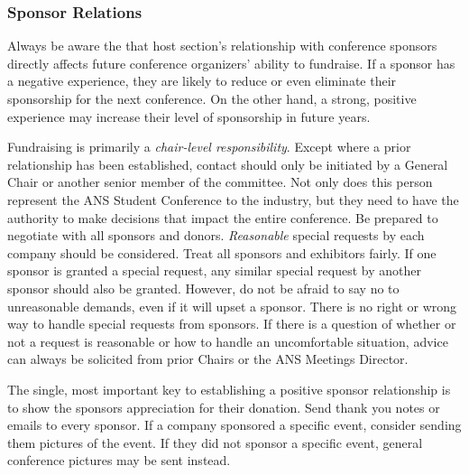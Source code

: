 \documentclass[12pt]{article}
\begin{document}
\subsubsection{Sponsor Relations}
Always be aware the that host section's relationship with conference sponsors directly affects future conference organizers' ability to fundraise.
If a sponsor has a negative experience, they are likely to reduce or even eliminate their sponsorship for the next conference.
On the other hand, a strong, positive experience may increase their level of sponsorship in future years.

Fundraising is primarily a \emph{chair-level responsibility}.
Except where a prior relationship has been established, contact should only be initiated by a General Chair or another senior member of the committee.
Not only does this person represent the ANS Student Conference to the industry, but they need to have the authority to make decisions that impact the entire conference.
Be prepared to negotiate with all sponsors and donors.
\emph{Reasonable} special requests by each company should be considered.
Treat all sponsors and exhibitors fairly.
If one sponsor is granted a special request, any similar special request by another sponsor should also be granted.
However, do not be afraid to say no to unreasonable demands, even if it will upset a sponsor.
There is no right or wrong way to handle special requests from sponsors.
If there is a question of whether or not a request is reasonable or how to handle an uncomfortable situation, advice can always be solicited from prior Chairs or the ANS Meetings Director.

The single, most important key to establishing a positive sponsor relationship is to show the sponsors appreciation for their donation.
Send thank you notes or emails to every sponsor.
If a company sponsored a specific event, consider sending them pictures of the event.
If they did not sponsor a specific event, general conference pictures may be sent instead.
\end{document}
